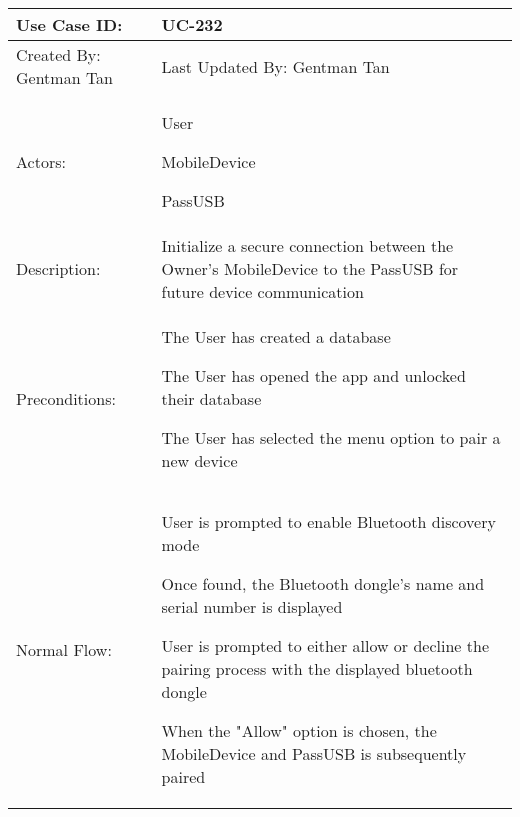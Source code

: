 \documentclass[stu]{apa7}
\newcommand{\nextitem}{\par\hspace*{\labelsep}\textbullet\hspace*{\labelsep}}
\begin{document}
\begin{xltabular}{\textwidth}{|l|X|}

  \hline Use Case ID: & UC-232 \\ \hline
  Created By: Gentman Tan & Last Updated By: Gentman Tan \\ \hline
  Actors: & \nextitem User \nextitem MobileDevice \nextitem PassUSB \\ \hline
  Description: & Initialize a secure connection between the Owner's MobileDevice to the PassUSB for future device communication \\ \hline
  Preconditions: & \nextitem The User has created a database \nextitem The User has opened the app and unlocked their database \nextitem The User has selected the menu option to pair a new device\\ \hline
  Normal Flow: &
  \nextitem User is prompted to enable Bluetooth discovery mode 
  \nextitem Once found, the Bluetooth dongle's name and serial number is displayed
  \nextitem User is prompted to either allow or decline the pairing process with the displayed bluetooth dongle
  \nextitem When the "Allow" option is chosen, the MobileDevice and PassUSB is subsequently paired \\ \hline

\end{xltabular}
\end{document}
